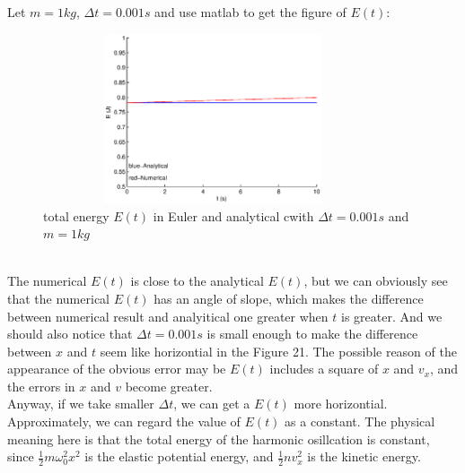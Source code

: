 \documentclass{article}
\begin{document}
\subsection{}
Let $m=1kg$, $\Delta t=0.001s $ and use matlab to get the figure of $E(t)$:
\begin{figure}[!htb]
	\begin{center}
		\includegraphics[height=5cm,width=10cm]{Problem3}
	\end{center}
	\caption{total energy $E(t)$ in Euler and analytical cwith $\Delta t=0.001s$ and $m=1kg$}
\end{figure}
\\\indent The numerical $E(t)$ is close to the analytical $E(t)$, but we can obviously see that the numerical $E(t)$ has an angle of slope, which makes the difference between numerical result and analyitical one greater when $t$ is greater. And we should also notice that $\Delta t=0.001s$ is small enough to make the difference between $x$ and $t$ seem like horizontial in the Figure 21. The possible reason of the appearance of the obvious error may be $E(t)$ includes a square of $x$ and $v_x$, and the errors in $x$ and $v$ become greater.
\\\indent Anyway, if we take smaller $\Delta t$, we can get a $E(t)$ more horizontial. Approximately, we can regard the value of $E(t)$ as a constant. The physical meaning here is that the total energy of the harmonic osillcation is constant, since $\frac{1}{2}m\omega_0^2x^2$ is the elastic potential energy, and $\frac{1}{2}nv_x^2$ is the kinetic energy.
\end{document}
